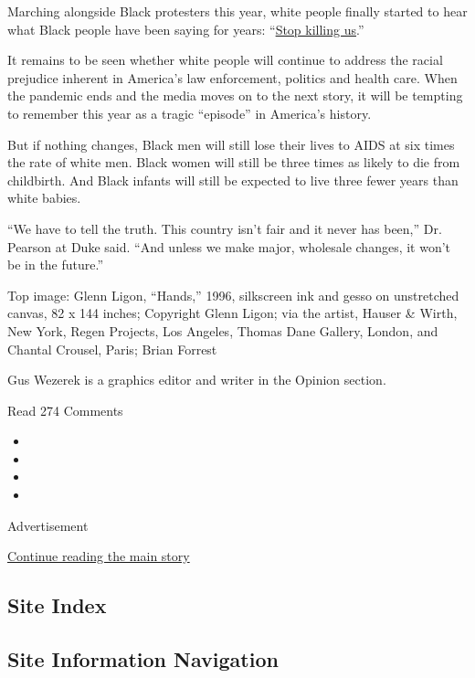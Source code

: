 Marching alongside Black protesters this year, white people finally
started to hear what Black people have been saying for years:
``\href{https://www.nytimes3xbfgragh.onion/2015/05/10/magazine/our-demand-is-simple-stop-killing-us.html}{Stop
killing us}.''

It remains to be seen whether white people will continue to address the
racial prejudice inherent in America's law enforcement, politics and
health care. When the pandemic ends and the media moves on to the next
story, it will be tempting to remember this year as a tragic ``episode''
in America's history.

But if nothing changes, Black men will still lose their lives to AIDS at
six times the rate of white men. Black women will still be three times
as likely to die from childbirth. And Black infants will still be
expected to live three fewer years than white babies.

``We have to tell the truth. This country isn't fair and it never has
been,'' Dr. Pearson at Duke said. ``And unless we make major, wholesale
changes, it won't be in the future.''

Top image: Glenn Ligon, ``Hands,'' 1996, silkscreen ink and gesso on
unstretched canvas, 82 x 144 inches; Copyright Glenn Ligon; via the
artist, Hauser \& Wirth, New York, Regen Projects, Los Angeles, Thomas
Dane Gallery, London, and Chantal Crousel, Paris; Brian Forrest

Gus Wezerek is a graphics editor and writer in the Opinion section.

Read 274 Comments

\begin{itemize}
\item
\item
\item
\item
\end{itemize}

Advertisement

\protect\hyperlink{after-bottom}{Continue reading the main story}

\hypertarget{site-index}{%
\subsection{Site Index}\label{site-index}}

\hypertarget{site-information-navigation}{%
\subsection{Site Information
Navigation}\label{site-information-navigation}}

